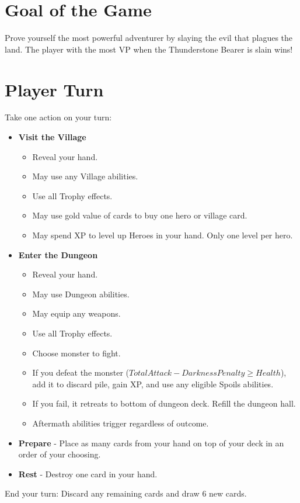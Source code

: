 \documentclass[12pt]{article}
\newenvironment{itemizeCustom}
{\begin{itemize}
  \setlength{\itemsep}{1pt}
  \setlength{\parskip}{0pt}
  \setlength{\parsep}{0pt}}
{\end{itemize}}
\begin{document}
\begin{multicols*}{2}
\section*{Goal of the Game}
Prove yourself the most powerful adventurer by slaying the evil that plagues the land. The player with the most VP when the Thunderstone Bearer is slain wins!

\section*{Player Turn}
Take one action on your turn:
\begin{itemizeCustom}
	\item \textbf{Visit the Village} 
		\begin{itemizeCustom}
			\item Reveal your hand. 
			\item May use any Village abilities. 
			\item Use all Trophy effects. 
			\item May use gold value of cards to buy one hero or village card. 
			\item May spend XP to level up Heroes in your hand. Only one level per hero.
		\end{itemizeCustom}
	\item \textbf{Enter the Dungeon} 
		\begin{itemizeCustom}
			\item Reveal your hand. 
			\item May use Dungeon abilities.
			\item May equip any weapons. 
			\item Use all Trophy effects. 
			\item Choose monster to fight.
			\item If you defeat the monster ($Total Attack - Darkness Penalty \ge Health$), add it to discard pile, gain XP, and use any eligible Spoils abilities. 
			\item If you fail, it retreats to bottom of dungeon deck. Refill the dungeon hall.
			\item Aftermath abilities trigger regardless of outcome.
		\end{itemizeCustom}
	\item \textbf{Prepare} - Place as many cards from your hand on top of your deck in an order of your choosing.
	\item \textbf{Rest} - Destroy one card in your hand.

\end{itemizeCustom}
End your turn: Discard any remaining cards and draw 6 new cards.


\end{multicols*}
\end{document}
